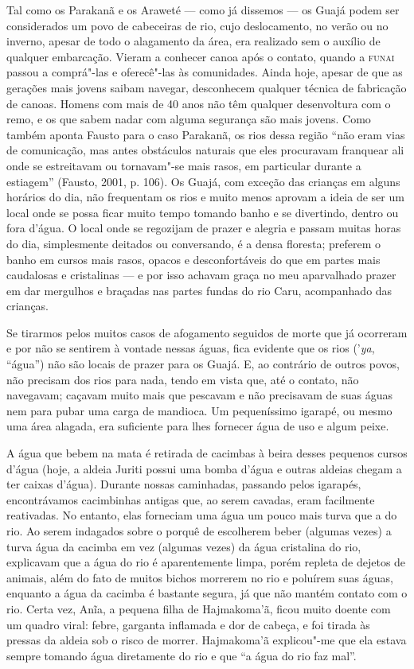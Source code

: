 Tal como os Parakanã e os Araweté --- como já dissemos --- os Guajá podem
ser considerados um povo de cabeceiras de rio, cujo deslocamento, no
verão ou no inverno, apesar de todo o alagamento da área, era realizado
sem o auxílio de qualquer embarcação. Vieram a conhecer canoa após o
contato, quando a \textsc{funai} passou a comprá"-las e oferecê"-las às
comunidades. Ainda hoje, apesar de que as gerações mais jovens saibam
navegar, desconhecem qualquer técnica de fabricação de canoas. Homens
com mais de 40 anos não têm qualquer desenvoltura com o remo, e os que
sabem nadar com alguma segurança são mais jovens. Como também aponta
Fausto para o caso Parakanã, os rios dessa região ``não eram vias de
comunicação, mas antes obstáculos naturais que eles procuravam franquear
ali onde se estreitavam ou tornavam"-se mais rasos, em particular durante
a estiagem'' (Fausto, 2001, p. 106). Os Guajá, com exceção das crianças
em alguns horários do dia, não frequentam os rios e muito menos aprovam
a ideia de ser um local onde se possa ficar muito tempo tomando banho e
se divertindo, dentro ou fora d'água. O local onde se regozijam de
prazer e alegria e passam muitas horas do dia, simplesmente deitados ou
conversando, é a densa floresta; preferem o banho em cursos mais rasos,
opacos e desconfortáveis do que em partes mais caudalosas e cristalinas
--- e por isso achavam graça no meu aparvalhado prazer em dar mergulhos e
braçadas nas partes fundas do rio Caru, acompanhado das crianças.

Se tirarmos pelos muitos casos de afogamento seguidos de morte que já
ocorreram e por não se sentirem à vontade nessas águas, fica evidente
que os rios ('\emph{ya}, ``água'') não são locais de prazer para os Guajá.
E, ao contrário de outros povos, não precisam dos rios para nada, tendo
em vista que, até o contato, não navegavam; caçavam muito mais que
pescavam e não precisavam de suas águas nem para pubar uma carga de
mandioca. Um pequeníssimo igarapé, ou mesmo uma área alagada, era
suficiente para lhes fornecer água de uso e algum peixe.

A água que bebem na mata é retirada de cacimbas à beira desses pequenos
cursos d'água (hoje, a aldeia Juriti possui uma bomba d'água e outras
aldeias chegam a ter caixas d'água). Durante nossas caminhadas, passando
pelos igarapés, encontrávamos cacimbinhas antigas que, ao serem cavadas,
eram facilmente reativadas. No entanto, elas forneciam uma água um pouco
mais turva que a do rio. Ao serem indagados sobre o porquê de escolherem
beber (algumas vezes) a turva água da cacimba em vez (algumas vezes) da
água cristalina do rio, explicavam que a água do rio é aparentemente
limpa, porém repleta de dejetos de animais, além do fato de muitos
bichos morrerem no rio e poluírem suas águas, enquanto a água da cacimba
é bastante segura, já que não mantém contato com o rio. Certa vez, Anĩa,
a pequena filha de Hajmakoma'ã, ficou muito doente com um quadro viral:
febre, garganta inflamada e dor de cabeça, e foi tirada às pressas da
aldeia sob o risco de morrer. Hajmakoma'ã explicou"-me que ela estava
sempre tomando água diretamente do rio e que ``a água do rio faz mal''.

